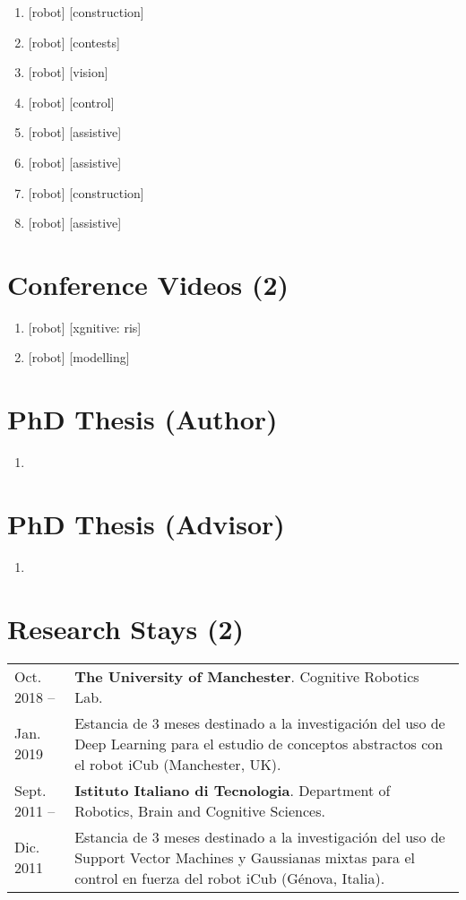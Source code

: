 \documentclass{article}
\begin{document}
\begin{enumerate}
  \item {} [robot] [construction]
  \item {} [robot] [contests]
  \item {} [robot] [vision]
  \item {} [robot] [control]
  \item {} [robot] [assistive]
  \item {} [robot] [assistive]
  \item {} [robot] [construction]
  \item {} [robot] [assistive]
\end{enumerate}

\section*{Conference Videos (2)}
\begin{enumerate}
  \item {} [robot] [xgnitive: ris]
  \item {} [robot] [modelling]
\end{enumerate}

\section*{PhD Thesis (Author)}
\begin{enumerate}
  \item {}
\end{enumerate}

\section*{PhD Thesis (Advisor)}
\begin{enumerate}
  \item {}
\end{enumerate}

\section*{Research Stays (2)}
\begin{tabular}{l p{14cm}}
Oct. 2018 --&{\bf The University of Manchester}. Cognitive Robotics Lab.\\
Jan. 2019&Estancia de 3 meses destinado a la investigación del uso de Deep Learning para el estudio de conceptos abstractos con el robot iCub (Manchester, UK).\\
\rule{0pt}{4ex}
Sept. 2011 --&{\bf Istituto Italiano di Tecnologia}. Department of Robotics, Brain and Cognitive Sciences.\\
Dic. 2011&Estancia de 3 meses destinado a la investigación del uso de Support Vector Machines y Gaussianas mixtas para el control en fuerza del robot iCub (Génova, Italia).
\end{tabular}
\end{document}
